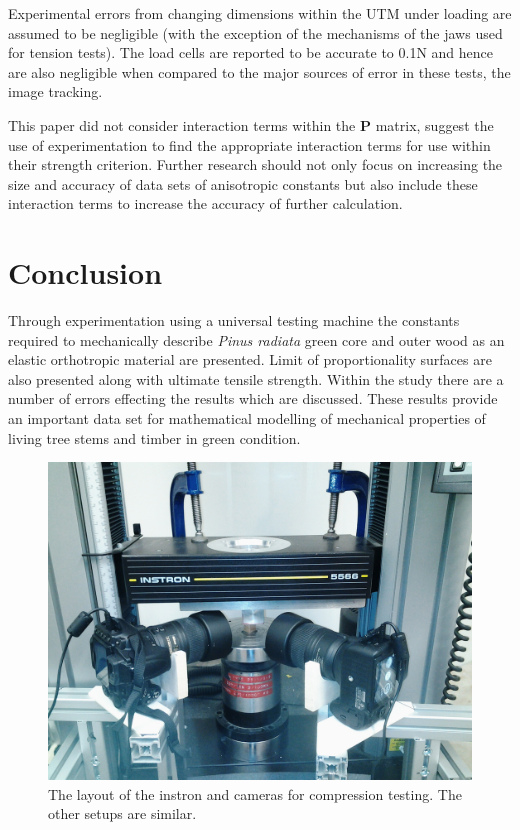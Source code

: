\documentclass[10pt]{article}
\begin{document}
Experimental errors from changing dimensions within the UTM under loading are assumed to be negligible (with the exception of the mechanisms of the jaws used for tension tests). The load cells are reported to be accurate to 0.1N and hence are also negligible when compared to the major sources of error in these tests, the image tracking.

This paper did not consider interaction terms within the \textbf{P} matrix, \citet{tsai_general_1971} suggest the use of experimentation to find the appropriate interaction terms for use within their strength criterion. Further research should not only focus on increasing the size and accuracy of data sets of anisotropic constants but also include these interaction terms to increase the accuracy of further calculation.

\section{Conclusion}
Through experimentation using a universal testing machine the constants required to mechanically describe \textit{Pinus radiata} green core and outer wood as an elastic orthotropic material are presented. Limit of proportionality surfaces are also presented along with ultimate tensile strength. Within the study there are a number of errors effecting the results which are discussed. These results provide an important data set for mathematical modelling of mechanical properties of living tree stems and timber in green condition.

\pagebreak

{}


\pagebreak
\begin{figure}[!ht]
\begin{center}
\includegraphics[width=0.7\columnwidth]{figs/setup.jpg}
\caption[Experimental layout]{\label{fig:setup} The layout of the instron and cameras for compression testing. The other setups are similar.
}
\end{center}
\end{figure}
\end{document}

